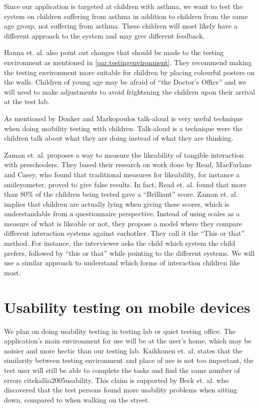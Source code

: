 Since our application is targeted at children with asthma, we want to test the system on children suffering from asthma in addition to children from the same age group, not suffering from asthma. These children will most likely have a different approach to the system and may give different feedback.

Hanna et. al. also point out changes that should be made to the testing environment as mentioned in \ref{par:testingenvironment}. They recommend making the testing environment more suitable for children by placing colourful posters on the walls.
Children of young age may be afraid of ``the Doctor's Office'' and we will need to make adjustments to avoid frightening the children upon their arrival at the test lab. 

As mentioned by Donker and Markopoulos\cite{TalkAloud} talk-aloud is very useful technique when doing usability testing with children. Talk-aloud is a technique were the children talk about what they are doing instead of what they are thinking.

Zaman et. al. proposes a way to measure the likeability of tangible interaction with preschoolers\cite{zaman2007measure}. They based their research on work done by Read, MacFarlane and Casey\cite{read2002endurability}, who found that traditional measures for likeability, for instance a smileyometer, proved to give false results. In fact, Read et. al. found that more than 80\% of the children being tested gave a ``Brilliant'' score. Zaman et. al. implies that children are actually lying when giving these scores, which is understandable from a questionnaire perspective. Instead of using scales as a measure of what is likeable or not, they propose a model where they compare different interaction systems against eachother. They call it the ``This or that'' method. For instance, the interviewer asks the child which system the child prefers, followed by ``this or that'' while pointing to the different systems. We will use a similar approach to understand which forms of interaction children like most.  


\section{Usability testing on mobile devices}
\label{sec:usabilitytestonmobiledevices}
We plan on doing usability testing in testing lab or quiet testing office. The application's main environment for use will be at the user's home, which may be noisier and more hectic than our testing lab. Kaikkonen et. al. states that the similarity between testing environment and place of use is not too important, the test user will still be able to complete the tasks and find the same number of errors cite{kallio2005usability}. This claim is supported by Beck et. al. who discovered that the test persons found more usability problems when sitting down, compared to when walking on the street\cite{beck2003experimental}. 

